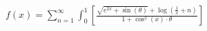 \documentclass[preview]{standalone}
\begin{document}
\begin{align*}
f(x) = \sum_{n=1}^{\infty} \int_{0}^{1} \left[ \frac{\sqrt{e^{2x} + \sin(\theta)} + \log\left(\frac{1}{x} + n\right)}{1 + \cos^2(x) \cdot \theta} \right]
\end{align*}
\end{document}
